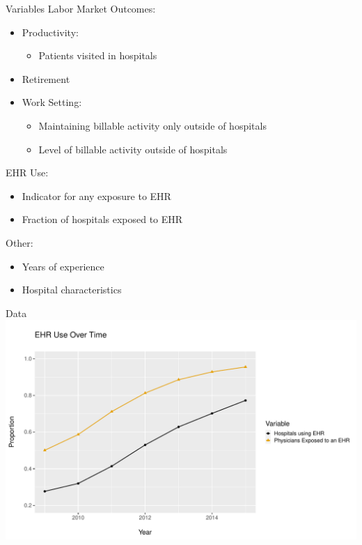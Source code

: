 \documentclass[10pt]{beamer}
\begin{document}
\begin{frame}{Variables}
Labor Market Outcomes:
\begin{itemize}
\item Productivity:
\begin{itemize}
    \item Patients visited in hospitals
\end{itemize}
\end{itemize}
\begin{itemize}
\item \color{gray} Retirement
\end{itemize}
\begin{itemize}
\item \color{gray} Work Setting:
\begin{itemize}
    \item \color{gray} Maintaining billable activity only outside of hospitals
    \item \color{gray} Level of billable activity outside of hospitals
\end{itemize}
\end{itemize}

EHR Use:
\vspace{-2mm}
\begin{itemize}
    \item Indicator for any exposure to EHR
    \item \color{gray} Fraction of hospitals exposed to EHR
\end{itemize}

Other:
\vspace{-2mm}
\begin{itemize}
    \item Years of experience
    \item Hospital characteristics
\end{itemize}

\end{frame}


\begin{frame}{Data}
    \centering
    \includegraphics[scale=.5]{Objects/sum_stats_year.pdf}
\end{frame}
\end{document}
